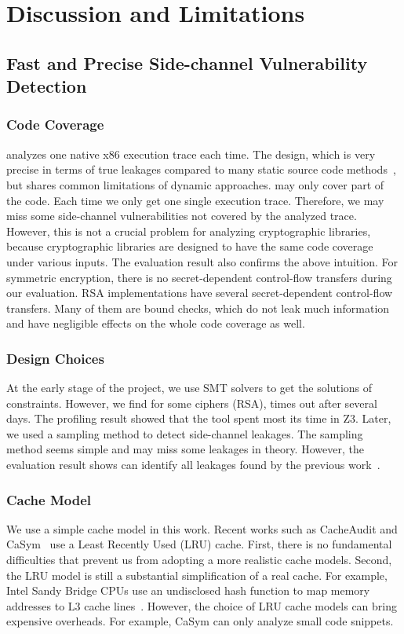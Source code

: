 \chapter{Discussion and Limitations}\label{chapter6}
\section{Fast and Precise Side-channel Vulnerability Detection}
\subsection*{Code Coverage} \detect{} analyzes one native x86 execution trace each time. The design, which is very precise in terms of true leakages compared to many static source code methods~\cite{197207,BacelarAlmeida:2013:FVS:2483313.2483334}, but shares common limitations of dynamic approaches. \detect{} may only cover part of the code. Each time we only get one single execution trace. Therefore, we may miss some side-channel vulnerabilities not covered by the analyzed trace. However, this is not a crucial problem for analyzing cryptographic libraries, because cryptographic libraries are designed to have the same code coverage under various inputs. The evaluation result also confirms the above intuition. For symmetric encryption, there is no secret-dependent control-flow transfers during our evaluation. RSA implementations have several secret-dependent control-flow transfers. Many of them are bound checks, which do not leak much information and have negligible effects on the whole code coverage as well.

\subsection*{Design Choices} At the early stage of the project, we use SMT solvers to get the solutions of constraints. However, we find for some ciphers (RSA), \detect{} times out after several days. The profiling result showed that the tool spent most its time in Z3. Later, we used a sampling method to detect side-channel leakages. The sampling method seems simple and may miss some leakages in theory. However, the evaluation result shows \detect{} can identify all leakages found by the previous work~\cite{203878,236338,Brotzman19Casym}.  

\subsection*{Cache Model} We use a simple cache model in this work. Recent works such as CacheAudit and CaSym~\cite{Brotzman19Casym,182946} use a Least Recently Used (LRU) cache. First, there is no fundamental difficulties that prevent us from adopting a more realistic cache models. Second, the LRU model is still a substantial simplification of a real cache. For example, Intel Sandy Bridge CPUs use an undisclosed hash function to map memory addresses to L3 cache lines~\cite{farshin2019make}. However, the choice of LRU  cache models can bring expensive overheads. For example, CaSym can only analyze small code snippets.

